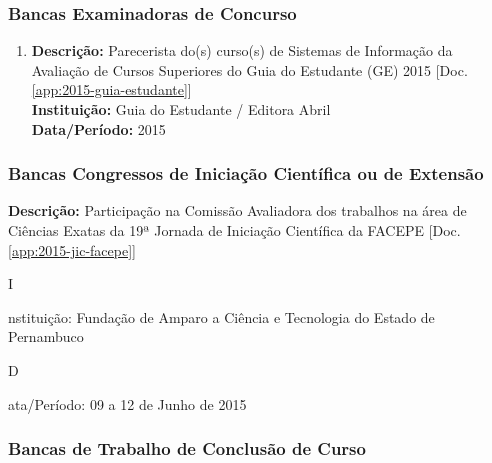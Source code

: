 \documentclass[a4paper,oneside,12pt]{article}
\newcommand{\SubItem}[1]{
    {\setlength\itemindent{15pt} \item[-] #1}}
\begin{document}
\subsubsection{Bancas Examinadoras de Concurso}
\vspace{0.3cm}

\begin{enumerate}
\renewcommand{\labelenumi}{{\large\bfseries\arabic{enumi}.}}
\vspace{0.3cm}

\item       \textbf{Descrição:} Parecerista do(s) curso(s) de Sistemas de Informação da Avaliação de Cursos Superiores do Guia do Estudante (GE) 2015 [Doc. \ref{app:2015-guia-estudante}]\\
            \textbf{Instituição:} Guia do Estudante / Editora Abril \\
            \textbf{Data/Período:} 2015 %

\end{enumerate}


\subsubsection{Bancas Congressos de Iniciação Científica ou de Extensão}
\vspace{0.3cm}

\begin{enumerate}
\renewcommand{\labelenumi}{{\large\bfseries\arabic{enumi}.}}
\vspace{0.3cm}

\item   \textbf{Descrição:}  Participação na Comissão Avaliadora dos trabalhos na área de Ciências Exatas da 19ª Jornada de Iniciação Científica da FACEPE [Doc. \ref{app:2015-jic-facepe}]
    \SubItem  Instituição: Fundação de Amparo a Ciência e Tecnologia do Estado de Pernambuco 
     \SubItem Data/Período: 09 a 12 de Junho de 2015
\end{enumerate}


\subsubsection{Bancas de Trabalho de Conclusão de Curso}
\vspace{0.3cm}
\end{document}
